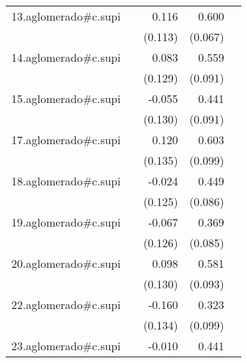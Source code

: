 {\begin{longtable}{l*{4}{D{.}{.}{-1}}}
\addlinespace
13.aglomerado#c.supi&                     &       0.116         &       0.600\sym{***}&                     \\
            &                     &     (0.113)         &     (0.067)         &                     \\
\addlinespace
14.aglomerado#c.supi&                     &       0.083         &       0.559\sym{***}&                     \\
            &                     &     (0.129)         &     (0.091)         &                     \\
\addlinespace
15.aglomerado#c.supi&                     &      -0.055         &       0.441\sym{***}&                     \\
            &                     &     (0.130)         &     (0.091)         &                     \\
\addlinespace
17.aglomerado#c.supi&                     &       0.120         &       0.603\sym{***}&                     \\
            &                     &     (0.135)         &     (0.099)         &                     \\
\addlinespace
18.aglomerado#c.supi&                     &      -0.024         &       0.449\sym{***}&                     \\
            &                     &     (0.125)         &     (0.086)         &                     \\
\addlinespace
19.aglomerado#c.supi&                     &      -0.067         &       0.369\sym{***}&                     \\
            &                     &     (0.126)         &     (0.085)         &                     \\
\addlinespace
20.aglomerado#c.supi&                     &       0.098         &       0.581\sym{***}&                     \\
            &                     &     (0.130)         &     (0.093)         &                     \\
\addlinespace
22.aglomerado#c.supi&                     &      -0.160         &       0.323\sym{**} &                     \\
            &                     &     (0.134)         &     (0.099)         &                     \\
\addlinespace
23.aglomerado#c.supi&                     &      -0.010         &       0.441\sym{***}&                     \\

\end{longtable}}
